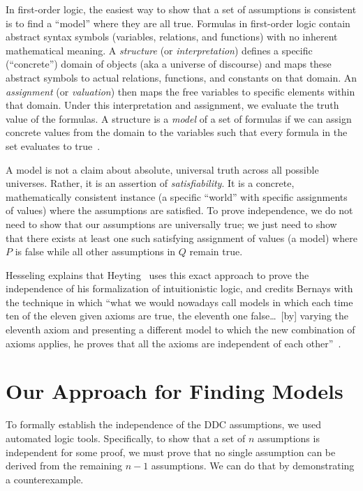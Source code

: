 In first-order logic, the easiest way to show that a set of assumptions is consistent is to find a ``model'' where they are all true. Formulas in first-order logic contain abstract syntax symbols (variables, relations, and functions) with no inherent mathematical meaning. A \emph{structure} (or \emph{interpretation}) defines a specific (``concrete'') domain of objects (aka a universe of discourse) and maps these abstract symbols to actual relations, functions, and constants on that domain. An \emph{assignment} (or \emph{valuation}) then maps the free variables to specific elements within that domain. Under this interpretation and assignment, we evaluate the truth value of the formulas. A structure is a \emph{model} of a set of formulas if we can assign concrete values from the domain to the variables such that every formula in the set evaluates to true~\cite{enderton2001logic}.

A model is not a claim about absolute, universal truth across all possible universes. Rather, it is an assertion of \emph{satisfiability}. It is a concrete, mathematically consistent instance (a specific ``world'' with specific assignments of values) where the assumptions are satisfied. To prove independence, we do not need to show that our assumptions are universally true; we just need to show that there exists at least one such satisfying assignment of values (a model) where $P$ is false while all other assumptions in $Q$ remain true.

Hesseling explains that Heyting~\cite{heyting1930regeln} uses this exact approach to prove the independence of his formalization of intuitionistic logic, and credits Bernays with the technique in which ``what we would nowadays call models in which each time ten of the eleven given axioms are true, the eleventh one false\dots\ [by] varying the eleventh axiom and presenting a different model to which the new combination of axioms applies, he proves that all the axioms are independent of each other''~\cite[page 278]{hesseling2003gnomes}.

\section{Our Approach for Finding Models}

To formally establish the independence of the DDC assumptions, we used automated logic tools. Specifically, to show that a set of $n$ assumptions is independent for some proof, we must prove that no single assumption can be derived from the remaining $n-1$ assumptions. We can do that by demonstrating a counterexample.

